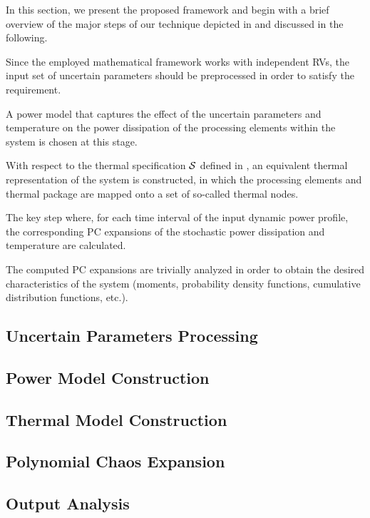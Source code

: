 In this section, we present the proposed framework and begin with a brief overview of the major steps of our technique depicted in  and discussed in the following.

 Since the employed mathematical framework works with independent RVs, the input set of uncertain parameters should be preprocessed in order to satisfy the requirement.

 A power model that captures the effect of the uncertain parameters and temperature on the power dissipation of the processing elements within the system is chosen at this stage.

 With respect to the thermal specification $\mathcal{S}$ defined in , an equivalent thermal representation of the system is constructed, in which the processing elements and thermal package are mapped onto a set of so-called thermal nodes.

 The key step where, for each time interval of the input dynamic power profile, the corresponding PC expansions of the stochastic power dissipation and temperature are calculated.

 The computed PC expansions are trivially analyzed in order to obtain the desired characteristics of the system (moments, probability density functions, cumulative distribution functions, etc.).

\subsection{Uncertain Parameters Processing} 


\subsection{Power Model Construction} 


\subsection{Thermal Model Construction} 


\subsection{Polynomial Chaos Expansion} 


\subsection{Output Analysis} 

